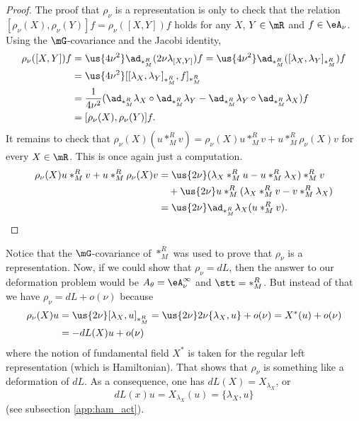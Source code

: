 \begin{proof}
The proof  that $\rho_{\nu}$ is a representation is only to check that the relation $[\rho_{\nu}(X),\rho_{\nu}(Y)]f=\rho_{\nu}([X,Y])f$ holds for any $X$, $Y\in\mR$ and $f\in\eA_{\nu}$. Using the $\mG$-covariance and the Jacobi identity,
\begin{equation}
\begin{split}
  \rho_{\nu}([X,Y])f&=\us{4\nu^2}\ad_{\ast_M^R}(2\nu\lambda_{[X,Y]})f
            =\us{4\nu^2}\ad_{\ast_M^R}([\lambda_X,\lambda_Y]_{\ast_M^R})f\\
        &=\us{4\nu^2}[[\lambda_X,\lambda_Y]_{\ast_M^R},f]_{\ast_M^R}\\
            &=\frac{1}{ 4\nu^2 }(\ad_{\ast_M^R}\lambda_X\circ\ad_{\ast_M^R}\lambda_Y-\ad_{\ast_M^R}\lambda_Y\circ\ad_{\ast_M^R}\lambda_X)f\\
        &=[\rho_{\nu}(X),\rho_{\nu}(Y)]f.
\end{split}
\end{equation}
It remains to check that $\rho_{\nu}(X)(u\ast_M^R v)=\rho_{\nu}(X)u\ast_M^R v+u\ast_M^R\rho_{\nu}(X)v$ for every $X\in\mR$. This is once again just a computation.
\begin{equation}
\begin{split}
   \rho_{\nu}(X)u\ast_M^R v+u\ast_M^R\rho_{\nu}(X)v&=\us{2\nu}(\lambda_X\ast_M^R u-u\ast_M^R\lambda_X)\ast_M^R v\\
                           &\quad+\us{2\nu}u\ast_M^R(\lambda_X\ast_M^R v-v\ast_M^R\lambda_X)\\
                           &=\us{2\nu}\ad_{\ast_M^R}\lambda_X(u\ast_M^R v).
\end{split}
\end{equation} 
\end{proof}
Notice that the $\mG$-covariance of $\ast_M^R$ was used to prove that $\rho_{\nu}$ is a representation.  Now, if we could show that $\rho_{\nu}=dL$, then the answer to our deformation problem would be $A_{\theta}=\eA^{\infty}_{\nu}$ and $\stt=\ast_M^R$. But instead of that we have $\rho_{\nu}=dL+o(\nu)$ because
\begin{equation}
\begin{split}
  \rho_{\nu}(X)u&=\us{2\nu}[\lambda_X,u]_{\ast_M^R}
         =\us{2\nu} 2\nu\{\lambda_X,u\}+o(\nu)
     =X^*(u)+o(\nu)\\
    &=-dL(X)u+o(\nu)
\end{split}
\end{equation}
where the notion of fundamental field $X^*$ is taken for the regular left representation (which is Hamiltonian). That shows that $\rho_{\nu}$ is something like a deformation of $dL$. As a consequence, one has $dL(X)=X_{\lambda_X}$, or
 \begin{equation}\label{eq:dL_et_Poisson}
 dL(x)u=X_{\lambda_X}(u)=\{\lambda_X,u\}
 \end{equation}
(see subsection \ref{app:ham_act}).
 
